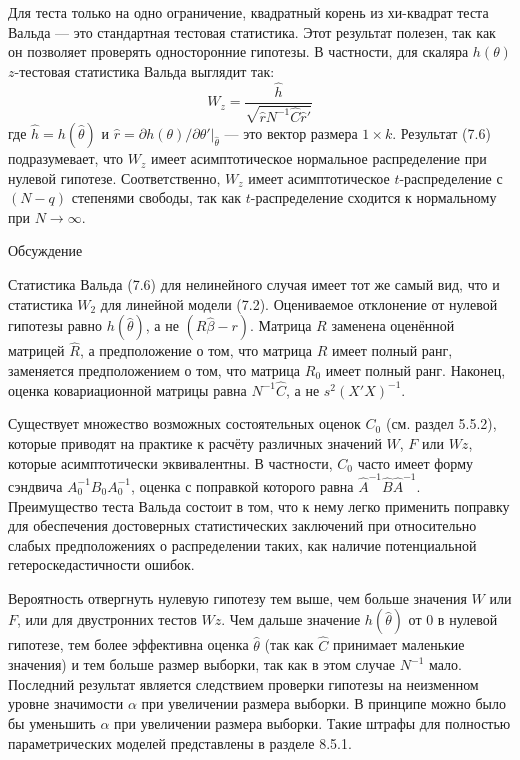 Для теста только на одно ограничение, квадратный корень из хи-квадрат теста Вальда --- это стандартная тестовая статистика. Этот результат полезен, так как он позволяет проверять односторонние гипотезы. В частности, для скаляра $h(\theta)$ $z$-тестовая статистика Вальда выглядит так:
\begin{equation}
W_z = \frac {\hat{h}}{\sqrt{\hat{r}N^{-1}\hat{C}\hat{r}'}}
\end{equation}
где $\hat{h} = h(\hat{\theta})$ и $\hat{r} = \partial{h(\theta)}/\partial{\theta'}|_{\hat{\theta}}$ --- это вектор размера $1 \times k$. Результат (7.6) подразумевает, что $W_z$ имеет асимптотическое нормальное распределение при нулевой гипотезе. Соответственно, $W_z$ имеет асимптотическое $t$-распределение с $(N-q)$ степенями свободы, так как $t$-распределение сходится к нормальному при $N \rightarrow \infty$.

\begin{center}
Обсуждение
\end{center}

Статистика Вальда (7.6) для нелинейного случая имеет тот же самый вид, что и статистика $W_2$ для линейной модели (7.2). Оцениваемое отклонение от нулевой гипотезы равно $h(\hat{\theta})$, а не $(R\hat{\beta} - r)$. Матрица $R$ заменена оценённой матрицей $\hat{R}$, а предположение о том, что матрица $R$ имеет полный ранг, заменяется предположением о том, что матрица $R_0$ имеет полный ранг. Наконец, оценка ковариационной матрицы равна $N^{-1}\hat{C}$, а не $s^2(X'X)^{-1}$.

Существует множество возможных состоятельных оценок $C_0$ (см. раздел 5.5.2), которые приводят на практике к расчёту  различных значений $W$, $F$ или $Wz$, которые асимптотически эквивалентны. В частности, $C_0$ часто имеет форму сэндвича $A_0^{-1}B_0A_0^{-1}$, оценка с поправкой которого равна $\hat{A}^{-1}\hat{B}\hat{A}^{-1}$. Преимущество теста Вальда состоит в том, что к нему легко применить поправку для обеспечения достоверных статистических заключений при относительно слабых предположениях о распределении таких, как наличие потенциальной гетероскедастичности ошибок.

Вероятность отвергнуть нулевую гипотезу тем выше, чем больше значения $W$ или $F$, или для двустронних тестов $Wz$. Чем дальше значение $h(\hat{\theta})$ от 0 в нулевой гипотезе, тем более эффективна оценка $\hat{\theta}$ (так как $\hat{C}$ принимает маленькие значения) и тем больше размер выборки, так как в этом случае $N^{-1}$ мало. Последний результат является следствием проверки гипотезы на неизменном уровне значимости $\alpha$ при увеличении размера выборки. В принципе можно было бы уменьшить $\alpha$ при увеличении размера выборки. Такие штрафы для полностью параметрических моделей представлены в разделе 8.5.1.


